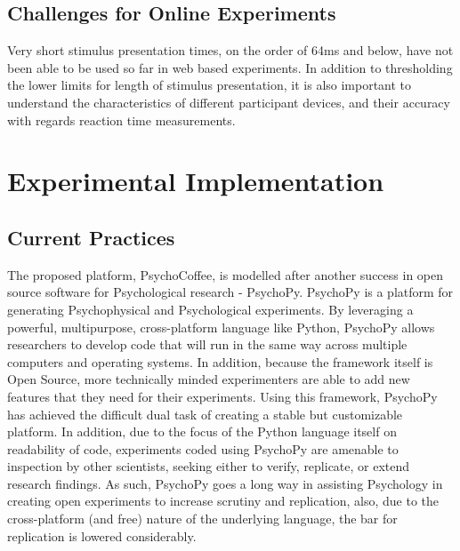 \documentclass[12pt,a4paper,titlepage]{scrreprt}
\begin{document}
\subsection{Challenges for Online Experiments}
Very short stimulus presentation times, on the order of 64ms and below, have not been able to be used so far in web based experiments\cite{crump_evaluating_2013}. In addition to thresholding the lower limits for length of stimulus presentation, it is also important to understand the characteristics of different participant devices, and their accuracy with regards reaction time measurements.
\section{Experimental Implementation}
\subsection{Current Practices}
The proposed platform, PsychoCoffee, is modelled after another success in open source software for Psychological research - PsychoPy\cite{peirce_psychopypsychophysics_2007}\cite{peirce_generating_2008}. PsychoPy is a platform for generating Psychophysical and Psychological experiments. By leveraging a powerful, multipurpose, cross-platform language like Python, PsychoPy allows researchers to develop code that will run in the same way across multiple computers and operating systems. In addition, because the framework itself is Open Source, more technically minded experimenters are able to add new features that they need for their experiments. Using this framework, PsychoPy has achieved the difficult dual task of creating a stable but customizable platform. In addition, due to the focus of the Python language itself on readability of code\cite{_python_????}, experiments coded using PsychoPy are amenable to inspection by other scientists, seeking either to verify, replicate, or extend research findings. As such, PsychoPy goes a long way in assisting Psychology in creating open experiments to increase scrutiny and replication, also, due to the cross-platform (and free) nature of the underlying language, the bar for replication is lowered considerably.
\end{document}
